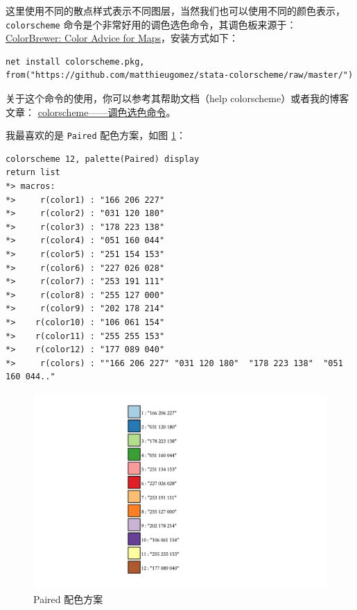 这里使用不同的散点样式表示不同图层，当然我们也可以使用不同的颜色表示，\lstinline{colorscheme} 命令是个非常好用的调色选色命令，其调色板来源于： \href{http://colorbrewer2.org/}{ColorBrewer: Color Advice for Maps}，安装方式如下：

\begin{lstlisting}
net install colorscheme.pkg, from("https://github.com/matthieugomez/stata-colorscheme/raw/master/")
\end{lstlisting}

关于这个命令的使用，你可以参考其帮助文档（help colorscheme）或者我的博客文章： \href{https://www.czxa.top/posts/16049/}{colorscheme——调色选色命令}。

我最喜欢的是 \texttt{Paired} 配色方案，如图 \ref{fig:Paired}：

\begin{lstlisting}
colorscheme 12, palette(Paired) display
return list
*> macros:
*>     r(color1) : "166 206 227"
*>     r(color2) : "031 120 180"
*>     r(color3) : "178 223 138"
*>     r(color4) : "051 160 044"
*>     r(color5) : "251 154 153"
*>     r(color6) : "227 026 028"
*>     r(color7) : "253 191 111"
*>     r(color8) : "255 127 000"
*>     r(color9) : "202 178 214"
*>    r(color10) : "106 061 154"
*>    r(color11) : "255 255 153"
*>    r(color12) : "177 089 040"
*>     r(colors) : ""166 206 227" "031 120 180"  "178 223 138"  "051 160 044.."
\end{lstlisting}

\begin{figure}[htbp]
  \centering
  \includegraphics[width=\textwidth]{assets/Paired.png}
  \caption{Paired 配色方案}
  \label{fig:Paired}
\end{figure}

